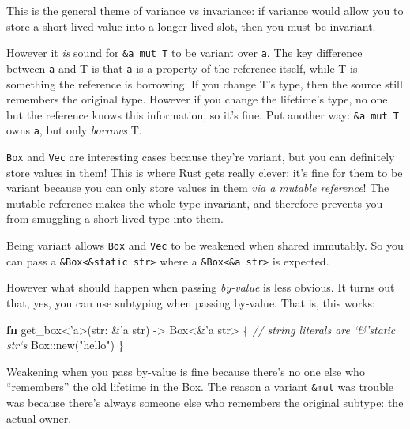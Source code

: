 \documentclass[a4paper,]{book}
\newenvironment{Shaded}{\begin{snugshade}}{\end{snugshade}}
\newcommand{\KeywordTok}[1]{\textcolor[rgb]{0.13,0.29,0.53}{\textbf{{#1}}}}
\newcommand{\DataTypeTok}[1]{\textcolor[rgb]{0.13,0.29,0.53}{{#1}}}
\newcommand{\StringTok}[1]{\textcolor[rgb]{0.31,0.60,0.02}{{#1}}}
\newcommand{\CommentTok}[1]{\textcolor[rgb]{0.56,0.35,0.01}{\textit{{#1}}}}
\newcommand{\OtherTok}[1]{\textcolor[rgb]{0.56,0.35,0.01}{{#1}}}
\newcommand{\NormalTok}[1]{{#1}}
\begin{document}
This is the general theme of variance vs invariance: if variance would
allow you to store a short-lived value into a longer-lived slot, then
you must be invariant.

However it \emph{is} sound for \texttt{\&\textquotesingle{}a\ mut\ T} to
be variant over \texttt{\textquotesingle{}a}. The key difference between
\texttt{\textquotesingle{}a} and T is that \texttt{\textquotesingle{}a}
is a property of the reference itself, while T is something the
reference is borrowing. If you change T's type, then the source still
remembers the original type. However if you change the lifetime's type,
no one but the reference knows this information, so it's fine. Put
another way: \texttt{\&\textquotesingle{}a\ mut\ T} owns
\texttt{\textquotesingle{}a}, but only \emph{borrows} T.

\texttt{Box} and \texttt{Vec} are interesting cases because they're
variant, but you can definitely store values in them! This is where Rust
gets really clever: it's fine for them to be variant because you can
only store values in them \emph{via a mutable reference}! The mutable
reference makes the whole type invariant, and therefore prevents you
from smuggling a short-lived type into them.

Being variant allows \texttt{Box} and \texttt{Vec} to be weakened when
shared immutably. So you can pass a
\texttt{\&Box\textless{}\&\textquotesingle{}static\ str\textgreater{}}
where a
\texttt{\&Box\textless{}\&\textquotesingle{}a\ str\textgreater{}} is
expected.

However what should happen when passing \emph{by-value} is less obvious.
It turns out that, yes, you can use subtyping when passing by-value.
That is, this works:

\begin{Shaded}
\begin{Highlighting}[]
\KeywordTok{fn} \NormalTok{get_box<}\OtherTok{'a}\NormalTok{>(}\DataTypeTok{str}\NormalTok{: &}\OtherTok{'a} \DataTypeTok{str}\NormalTok{) -> }\DataTypeTok{Box}\NormalTok{<&}\OtherTok{'a} \DataTypeTok{str}\NormalTok{> \{}
    \CommentTok{// string literals are `&'static str`s}
    \DataTypeTok{Box}\NormalTok{::new(}\StringTok{"hello"}\NormalTok{)}
\NormalTok{\}}
\end{Highlighting}
\end{Shaded}

Weakening when you pass by-value is fine because there's no one else who
``remembers'' the old lifetime in the Box. The reason a variant
\texttt{\&mut} was trouble was because there's always someone else who
remembers the original subtype: the actual owner.
\end{document}
